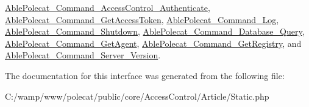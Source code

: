 \hyperlink{class_able_polecat___command___access_control___authenticate_a4ef9bd37ba3ce8a13c1e8bcf4f72a630}{Able\+Polecat\+\_\+\+Command\+\_\+\+Access\+Control\+\_\+\+Authenticate}, \hyperlink{class_able_polecat___command___get_access_token_a4ef9bd37ba3ce8a13c1e8bcf4f72a630}{Able\+Polecat\+\_\+\+Command\+\_\+\+Get\+Access\+Token}, \hyperlink{class_able_polecat___command___log_a4ef9bd37ba3ce8a13c1e8bcf4f72a630}{Able\+Polecat\+\_\+\+Command\+\_\+\+Log}, \hyperlink{class_able_polecat___command___shutdown_a4ef9bd37ba3ce8a13c1e8bcf4f72a630}{Able\+Polecat\+\_\+\+Command\+\_\+\+Shutdown}, \hyperlink{class_able_polecat___command___database___query_a4ef9bd37ba3ce8a13c1e8bcf4f72a630}{Able\+Polecat\+\_\+\+Command\+\_\+\+Database\+\_\+\+Query}, \hyperlink{class_able_polecat___command___get_agent_a4ef9bd37ba3ce8a13c1e8bcf4f72a630}{Able\+Polecat\+\_\+\+Command\+\_\+\+Get\+Agent}, \hyperlink{class_able_polecat___command___get_registry_a4ef9bd37ba3ce8a13c1e8bcf4f72a630}{Able\+Polecat\+\_\+\+Command\+\_\+\+Get\+Registry}, and \hyperlink{class_able_polecat___command___server___version_a4ef9bd37ba3ce8a13c1e8bcf4f72a630}{Able\+Polecat\+\_\+\+Command\+\_\+\+Server\+\_\+\+Version}.



The documentation for this interface was generated from the following file\+:\begin{DoxyCompactItemize}
\item 
C\+:/wamp/www/polecat/public/core/\+Access\+Control/\+Article/Static.\+php\end{DoxyCompactItemize}
